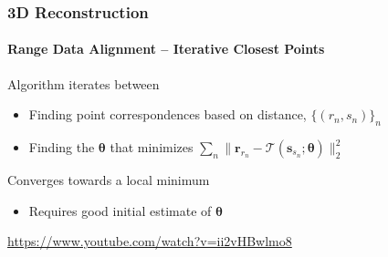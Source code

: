 \documentclass[xetex,professionalfont]{beamer}
\renewcommand{\vec}[1]{\ensuremath{\mathbf{#1}}}
\newcommand{\vr}{\vec{r}}
\newcommand{\vs}{\vec{s}}
\newcommand{\bth}{\boldsymbol{\theta}}
\newcommand{\trans}{\mathcal{T}}
\begin{document}

\begin{frame}
\frametitle{3D Reconstruction}
\framesubtitle{Range Data Alignment -- Iterative Closest Points}

Algorithm iterates between
\begin{itemize}
	\item Finding point correspondences based on distance, $\{(r_n,s_n)\}_n$ %
	\item Finding the $\bth$ that minimizes $\sum_n\lVert\vr_{r_n}-\trans(\vs_{s_n};\bth) \rVert_2^2$ %
\end{itemize}

\bigskip
Converges towards a local minimum
\begin{itemize}
	\item Requires good initial estimate of $\bth$ %
\end{itemize}

\bigskip
\begin{center}
	\url{https://www.youtube.com/watch?v=ii2vHBwlmo8}
\end{center}


\end{frame}

\end{document}
